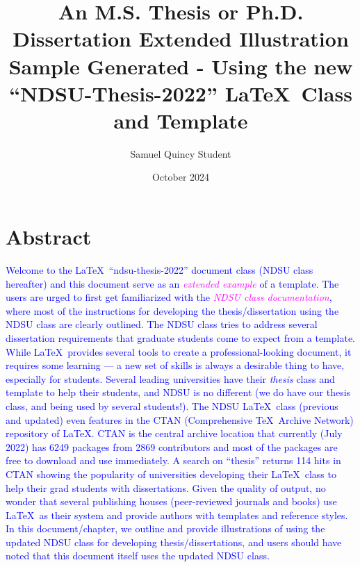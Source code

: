 \documentclass[phd]{ndsu-thesis-2022}
\title{An M.S. Thesis or Ph.D. Dissertation Extended Illustration Sample Generated - Using the new ``NDSU-Thesis-2022'' \LaTeX\ Class and Template}
\author{Samuel Quincy Student}
\date{October 2024}
\newcommand\italk[1]{\textcolor{blue}{#1}}  %
\begin{document}


\section{Abstract}
\italk{Welcome to the \LaTeX\ ``ndsu-thesis-2022'' document class (NDSU class hereafter) and this document serve as an \textcolor{magenta}{\emph{extended example}} of a template. The users are urged to first get familiarized with the \textcolor{magenta}{\emph{NDSU class documentation}}, where most of the instructions for developing the thesis/dissertation using the NDSU class are clearly outlined. The NDSU class tries to address several dissertation requirements that graduate students come to expect from a template. While \LaTeX\ provides several tools to create a professional-looking document, it requires some learning --- a new set of skills is always a desirable thing to have, especially for students. Several leading universities have their \emph{thesis} class and template to help their students, and NDSU is no different (we do have our thesis class, and being used by several students!). The NDSU \LaTeX\ class (previous and updated) even features in the CTAN (Comprehensive \TeX\ Archive Network) repository of \LaTeX. CTAN is the central archive location that currently (July 2022) has 6249 packages from 2869 contributors and most of the packages are free to download and use immediately. A search on ``thesis'' returns 114 hits in CTAN showing the popularity of universities developing their \LaTeX\ class to help their grad students with dissertations. Given the quality of output, no wonder that several publishing houses (peer-reviewed journals and books) use \LaTeX\ as their system and provide authors with templates and reference styles. In this document/chapter, we outline and provide illustrations of using the updated NDSU class for developing thesis/dissertations, and users should have noted that this document itself uses the updated NDSU class.\\ 
}
\end{document}
